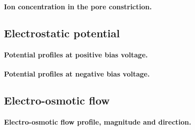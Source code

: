 \documentclass[journal=ancac3, manuscript=article, etalmode=truncate,maxauthors=0]{achemso}
\begin{document}
\paragraph{Ion concentration in the pore constriction.}




%

\subsection{Electrostatic potential}

\paragraph{Potential profiles at positive bias voltage.}
\paragraph{Potential profiles at negative bias voltage.}




\subsection{Electro-osmotic flow}


\paragraph{Electro-osmotic flow profile, magnitude and direction.}
\end{document}
